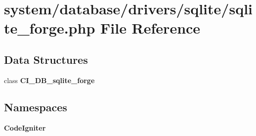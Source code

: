 \section{system/database/drivers/sqlite/sqlite\-\_\-forge.php File Reference}
\label{sqlite__forge_8php}
\subsection*{Data Structures}
\begin{DoxyCompactItemize}
\item 
class {\bf C\-I\-\_\-\-D\-B\-\_\-sqlite\-\_\-forge}
\end{DoxyCompactItemize}
\subsection*{Namespaces}
\begin{DoxyCompactItemize}
\item 
{\bf Code\-Igniter}
\end{DoxyCompactItemize}
